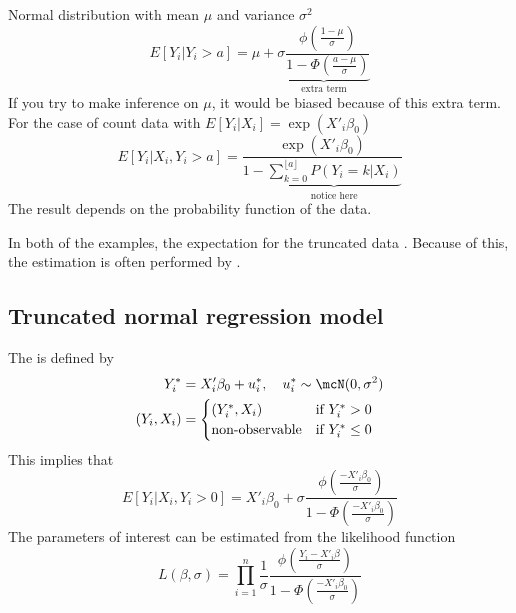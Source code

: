 \begin{Example}
    Normal distribution with mean $\mu$ and variance $\sigma^2$
    \begin{equation*}
        E[Y_i|Y_i>a] = \mu + \underbrace{\sigma\frac{\phi(\frac{1-\mu}{\sigma})}{1-\Phi(\frac{a-\mu}{\sigma})}}_{\text{extra term}}
    \end{equation*}
    If you try to make inference on $\mu$, it would be biased because of this extra term.\\

    For the case of count data with $E[Y_i|X_i] = \exp(X'_i\beta_0)$
    \begin{equation*}
        E[Y_i|X_i,Y_i>a] = \frac{\exp(X'_i\beta_0)}{1 - \underbrace{\sum_{k=0}^{\lfloor a \rfloor}P(Y_i=k|X_i)}_{\text{notice here}}}
    \end{equation*}
    The result depends on the probability function of the data.
\end{Example}
In both of the examples, the expectation for the truncated data .
Because of this, the estimation is often performed by .

\subsection{Truncated normal regression model}
The  is defined by 
\begin{align*}
    Y_i^* & = X'_i\beta_0+u_i^*,\quad u_i^*\sim\mcN(0,\sigma^2)\\
    (Y_i,X_i) & = \begin{cases}
        (Y_i^*,X_i) & \text{if }Y_i^* > 0\\
        \text{non-observable} & \text{if }Y_i^*\leq 0
    \end{cases}
\end{align*}
This implies that 
\begin{equation*}
    E[Y_i|X_i, Y_i>0] = X'_i\beta_0 + \sigma\frac{\phi(\frac{-X'_i\beta_0}{\sigma})}{1-\Phi(\frac{-X'_i\beta_0}{\sigma})}
\end{equation*}
The parameters of interest can be estimated from the likelihood function 
\begin{equation*}
    L(\beta,\sigma) = \prod_{i=1}^{n}\frac{1}{\sigma}\frac{\phi(\frac{Y_i-X'_i\beta}{\sigma})}{1-\Phi(\frac{-X'_i\beta_0}{\sigma})}
\end{equation*}

